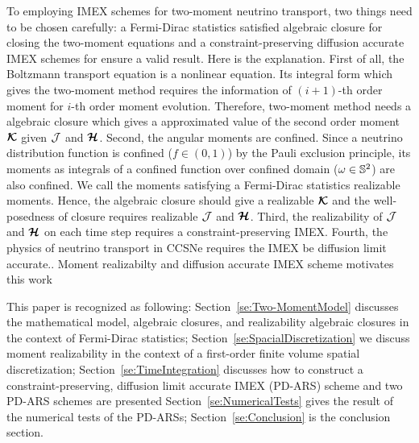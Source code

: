 To employing IMEX schemes for two-moment neutrino transport, two things need to be chosen carefully: a Fermi-Dirac statistics satisfied algebraic closure for closing the two-moment equations and a constraint-preserving diffusion accurate IMEX schemes for ensure a valid result.
Here is the explanation.
First of all, the Boltzmann transport equation is a nonlinear equation.
Its integral form which gives the two-moment method requires the information of $(i+1)$-th order moment for $i$-th order moment evolution.
Therefore, two-moment method needs a algebraic closure which gives a approximated value of the second order moment $\boldsymbol{\mathcal{K}}$ given $\mathcal{J}$ and $\boldsymbol{\mathcal{H}}$.
Second, the angular moments are confined. Since a neutrino distribution function is confined ($f\in(0,1)$) by the Pauli exclusion principle, its moments as integrals of a confined function over confined domain ($\omega\in\mathbb{S}^{2}$) are also confined.
We call the moments satisfying a Fermi-Dirac statistics realizable moments.
Hence, the algebraic closure should give a realizable $\boldsymbol{\mathcal{K}}$ and the well-posedness of closure requires realizable $\mathcal{J}$ and $\boldsymbol{\mathcal{H}}$.
Third, the realizability of $\mathcal{J}$ and $\boldsymbol{\mathcal{H}}$ on each time step requires a constraint-preserving IMEX.
Fourth, the physics of neutrino transport in CCSNe requires the IMEX be diffusion limit accurate.. 
Moment realizabilty and diffusion accurate IMEX scheme motivates this work

This paper is recognized as following: Section~\ref{se:Two-MomentModel} discusses the mathematical model, algebraic closures, and realizability algebraic closures in the context of Fermi-Dirac statistics;
Section~\ref{se:SpacialDiscretization} we discuss moment realizability in the context of a first-order finite volume spatial discretization; Section~\ref{se:TimeIntegration} discusses how to construct a constraint-preserving, diffusion limit accurate IMEX (PD-ARS) scheme and two PD-ARS schemes are presented %
Section~\ref{se:NumericalTests} gives the result of the numerical tests of the PD-ARSs; Section~\ref{se:Conclusion} is the conclusion section.